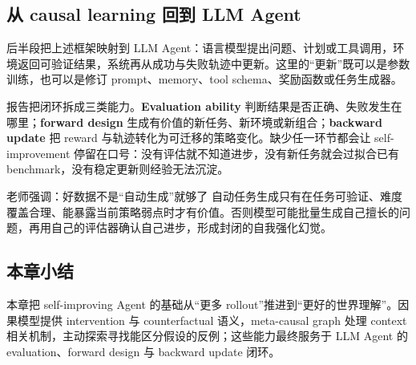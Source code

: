 \subsection{从 causal learning 回到 LLM Agent}

后半段把上述框架映射到 LLM Agent：语言模型提出问题、计划或工具调用，环境返回可验证结果，系统再从成功与失败轨迹中更新。这里的“更新”既可以是参数训练，也可以是修订 prompt、memory、tool schema、奖励函数或任务生成器。


报告把闭环拆成三类能力。\textbf{Evaluation ability} 判断结果是否正确、失败发生在哪里；\textbf{forward design} 生成有价值的新任务、新环境或新组合；\textbf{backward update} 把 reward 与轨迹转化为可迁移的策略变化。缺少任一环节都会让 self-improvement 停留在口号：没有评估就不知道进步，没有新任务就会过拟合已有 benchmark，没有稳定更新则经验无法沉淀。





\begin{knowledgebox}{老师强调：好数据不是“自动生成”就够了}
自动任务生成只有在任务可验证、难度覆盖合理、能暴露当前策略弱点时才有价值。否则模型可能批量生成自己擅长的问题，再用自己的评估器确认自己进步，形成封闭的自我强化幻觉。
\end{knowledgebox}

\subsection{本章小结}

本章把 self-improving Agent 的基础从“更多 rollout”推进到“更好的世界理解”。因果模型提供 intervention 与 counterfactual 语义，meta-causal graph 处理 context 相关机制，主动探索寻找能区分假设的反例；这些能力最终服务于 LLM Agent 的 evaluation、forward design 与 backward update 闭环。

